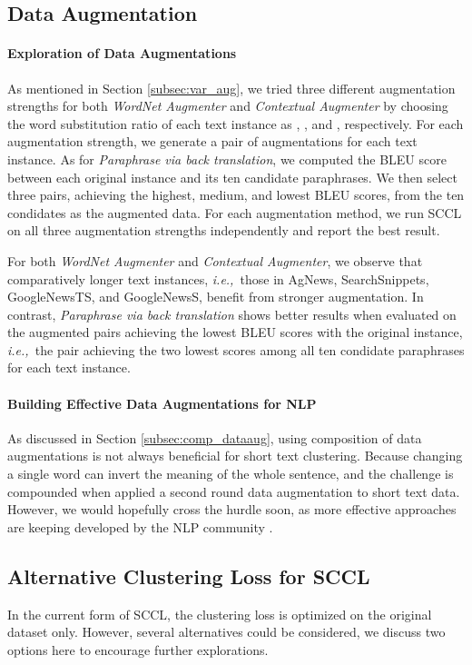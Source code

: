 \documentclass[11pt]{article}
\def\ie{{\em i.e.,~}}
\begin{document}
\subsection{Data Augmentation}
\label{appendix:var_aug}
\paragraph{Exploration of Data Augmentations}
As mentioned in Section \ref{subsec:var_aug}, we tried three different augmentation strengths for both \textit{WordNet Augmenter} and \textit{Contextual Augmenter} by choosing the word substitution ratio of each text instance as , , and , respectively. For each augmentation strength, we generate a pair of augmentations for each text instance. As for \textit{Paraphrase via back translation}, we computed the BLEU score between each original instance and its ten candidate paraphrases. We then select three pairs, achieving the highest, medium, and lowest BLEU scores, from the ten condidates as the augmented data. For each augmentation  method, we run SCCL on all three augmentation strengths independently and report the best result. 

For both \textit{WordNet Augmenter} and \textit{Contextual Augmenter}, we observe that comparatively longer text instances, \ie those in AgNews, SearchSnippets, GoogleNewsTS, and GoogleNewsS, benefit from stronger augmentation. 
In contrast, \textit{Paraphrase via back translation} shows better results when evaluated on the augmented pairs achieving the lowest BLEU scores with the original instance, \ie the pair achieving the two lowest scores among all ten condidate paraphrases for each text instance. 

\paragraph{Building Effective Data Augmentations for NLP} As discussed in Section \ref{subsec:comp_dataaug}, using composition of data augmentations is not always beneficial for short text clustering. Because changing a single word can invert the meaning of the whole sentence, and the challenge is compounded when applied a second round data augmentation to short text data. However, we would hopefully cross the hurdle soon, as more effective approaches are keeping developed by the NLP community \citet{qu2020coda, giorgi2020declutr, meng2021coco}.

\subsection{Alternative Clustering Loss for SCCL}
\label{appendix_cluster}
In the current form of SCCL, the clustering loss is optimized on the original dataset only. However, several alternatives could be considered, we discuss two options here to encourage further explorations. 
\end{document}
